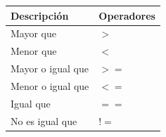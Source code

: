 \documentclass[]{article}
\begin{document}
\begin{longtable}[]{@{}ll@{}}
\toprule
\begin{minipage}[b]{0.29\columnwidth}\raggedright\strut
Descripción\strut
\end{minipage} & \begin{minipage}[b]{0.17\columnwidth}\raggedright\strut
Operadores\strut
\end{minipage}\tabularnewline
\midrule
\endhead
\begin{minipage}[t]{0.29\columnwidth}\raggedright\strut
Mayor que\strut
\end{minipage} & \begin{minipage}[t]{0.17\columnwidth}\raggedright\strut
\(>\)\strut
\end{minipage}\tabularnewline
\begin{minipage}[t]{0.29\columnwidth}\raggedright\strut
Menor que\strut
\end{minipage} & \begin{minipage}[t]{0.17\columnwidth}\raggedright\strut
\(<\)\strut
\end{minipage}\tabularnewline
\begin{minipage}[t]{0.29\columnwidth}\raggedright\strut
Mayor o igual que\strut
\end{minipage} & \begin{minipage}[t]{0.17\columnwidth}\raggedright\strut
\(>=\)\strut
\end{minipage}\tabularnewline
\begin{minipage}[t]{0.29\columnwidth}\raggedright\strut
Menor o igual que\strut
\end{minipage} & \begin{minipage}[t]{0.17\columnwidth}\raggedright\strut
\(<=\)\strut
\end{minipage}\tabularnewline
\begin{minipage}[t]{0.29\columnwidth}\raggedright\strut
Igual que\strut
\end{minipage} & \begin{minipage}[t]{0.17\columnwidth}\raggedright\strut
\(==\)\strut
\end{minipage}\tabularnewline
\begin{minipage}[t]{0.29\columnwidth}\raggedright\strut
No es igual que\strut
\end{minipage} & \begin{minipage}[t]{0.17\columnwidth}\raggedright\strut
\(!=\)\strut
\end{minipage}\tabularnewline
\bottomrule
\end{longtable}
\end{document}
